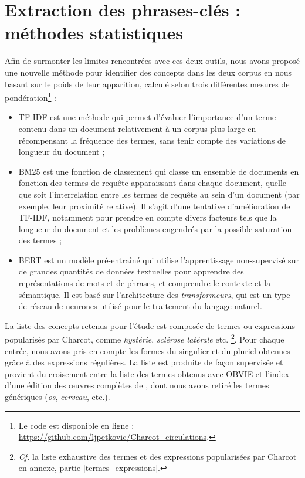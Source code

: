 \section{Extraction des phrases-clés : méthodes statistiques}
\label{methodo_stat}
Afin de surmonter les limites rencontrées avec ces deux outils, nous avons proposé une nouvelle méthode pour identifier des concepts dans les deux corpus en nous basant sur le poids de leur apparition, calculé selon trois différentes mesures de pondération\footnote{Le code est disponible en ligne : \url{https://github.com/ljpetkovic/Charcot\_circulations}.} :
\begin{itemize}
\item \textsc{TF-IDF} \citep{robertson1976relevance} est une méthode qui permet d'évaluer l'importance d'un terme contenu dans un document relativement à un corpus plus large en récompensant la fréquence des termes, sans tenir compte des variations de longueur du document ;
\item \textsc{BM25} est une fonction de classement qui classe un ensemble de documents en fonction des termes de requête apparaissant dans chaque document, quelle que soit l'interrelation entre les termes de requête au sein d'un document (par exemple, leur proximité relative). Il s'agit d'une tentative d'amélioration de \textsc{TF-IDF}, notamment pour prendre en compte divers facteurs tels que la longueur du document et les problèmes engendrés par la possible saturation des termes \citep[p.~355]{robertson2009probabilistic} ;
\item \textsc{BERT} \citep{devlin2019} est un modèle pré-entraîné qui utilise l'apprentissage non-supervisé sur de grandes quantités de données textuelles pour apprendre des représentations de mots et de phrases, et comprendre le contexte et la sémantique. Il est basé sur l'architecture des \textit{transformeurs}, qui est un type de réseau de neurones utilisé pour le traitement du langage naturel.
\end{itemize}

La liste des concepts retenus pour l'étude est composée de termes ou expressions popularisés par Charcot, comme \textit{hystérie}, \textit{sclérose latérale} etc. \citep[p.~1102]{camargo2024} \footnote{\textit{Cf.} la liste exhaustive des termes et des expressions popularisées par Charcot en annexe, partie \ref{termes_expressions}.}. Pour chaque entrée, nous avons pris en compte les formes du singulier et du pluriel obtenues grâce à des expressions régulières. La liste est  produite de façon supervisée et provient du croisement entre la liste des termes obtenus avec OBVIE et l'index d'une édition des \oe{}uvres complètes de \cite[pp.~493--507]{charcot1892oeuvres}, dont nous avons retiré les termes génériques (\textit{os}, \textit{cerveau}, etc.).

